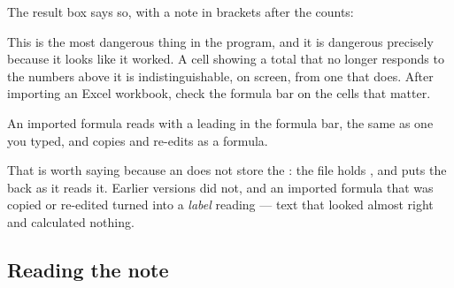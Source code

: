 The result box says so, with a note in brackets after the counts:

\begin{ccfigure}
\caption{The result of an XLSX import. The title is the first worksheet's name}
\label{fig:xlsxresult}
\end{ccfigure}

\begin{cccaution}
This is the most dangerous thing in the program, and it is dangerous precisely
because it looks like it worked. A cell showing a total that no longer responds
to the numbers above it is indistinguishable, on screen, from one that does.
After importing an Excel workbook, check the formula bar on the cells that
matter.
\end{cccaution}

\begin{ccnote}
An imported formula reads with a leading \lit{=} in the formula bar, the same
as one you typed, and copies and re-edits as a formula.

That is worth saying because an  does not store the \lit{=}: the
file holds , and \ccprod{} puts the \lit{=} back as it reads
it. Earlier versions did not, and an imported formula that was copied or
re-edited turned into a \emph{label} reading  --- text that
looked almost right and calculated nothing.
\end{ccnote}

\subsection{Reading the note}

